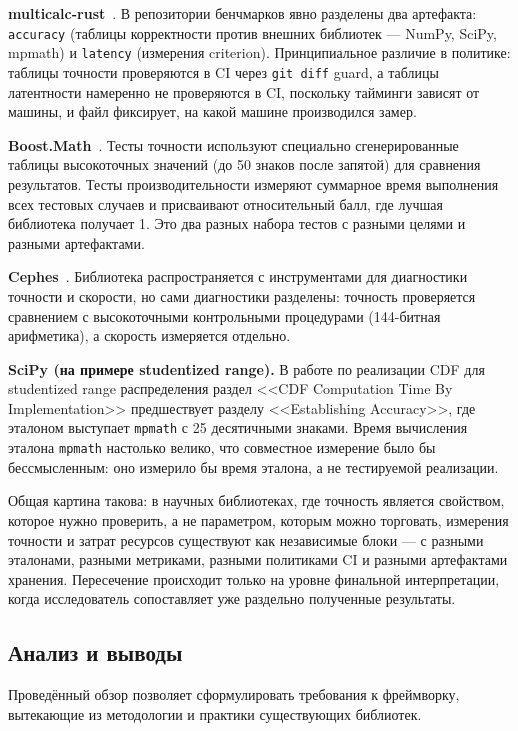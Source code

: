 \documentclass[12pt,a4paper]{article}
\begin{document}
\textbf{multicalc-rust}~\cite{multicalc_rust}. В репозитории
бенчмарков явно разделены два артефакта: \texttt{accuracy}
(таблицы корректности против внешних библиотек --- NumPy, SciPy,
mpmath) и \texttt{latency} (измерения criterion). Принципиальное
различие в политике: таблицы точности проверяются в CI через
\texttt{git diff} guard, а таблицы латентности намеренно
не проверяются в CI, поскольку тайминги зависят от машины,
и файл фиксирует, на какой машине производился замер.

\textbf{Boost.Math}~\cite{boost_math}. Тесты точности используют
специально сгенерированные таблицы высокоточных значений
(до 50 знаков после запятой) для сравнения результатов. Тесты
производительности измеряют суммарное время выполнения всех
тестовых случаев и присваивают относительный балл, где лучшая
библиотека получает 1. Это два разных набора тестов с разными
целями и разными артефактами.

\textbf{Cephes}~\cite{cephes}. Библиотека распространяется
с инструментами для диагностики точности и скорости, но сами
диагностики разделены: точность проверяется сравнением
с высокоточными контрольными процедурами (144-битная арифметика),
а скорость измеряется отдельно.

\textbf{SciPy (на примере studentized range).} В работе
по реализации CDF для studentized range распределения раздел
<<CDF Computation Time By Implementation>> предшествует разделу
<<Establishing Accuracy>>, где эталоном выступает \texttt{mpmath}
с 25 десятичными знаками. Время вычисления эталона \texttt{mpmath}
настолько велико, что совместное измерение было бы бессмысленным:
оно измерило бы время эталона, а не тестируемой реализации.

Общая картина такова: в научных библиотеках, где точность является
свойством, которое нужно проверить, а не параметром, которым можно
торговать, измерения точности и затрат ресурсов существуют как
независимые блоки --- с разными эталонами, разными метриками,
разными политиками CI и разными артефактами хранения. Пересечение
происходит только на уровне финальной интерпретации, когда
исследователь сопоставляет уже раздельно полученные результаты.

\subsection{Анализ и выводы}

Проведённый обзор позволяет сформулировать требования к фреймворку,
вытекающие из методологии и практики существующих библиотек.
\end{document}
